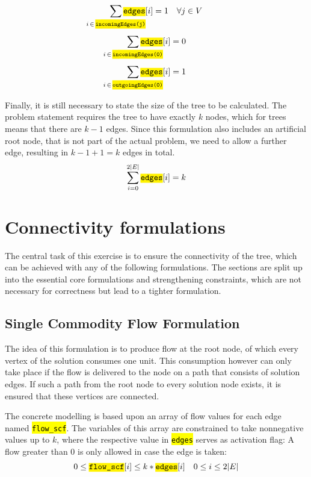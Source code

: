 \documentclass[,%
			paper=a4,%
			DIV12,
			liststotoc,
			bibtotoc,
			draft=false,%
			numbers=noendperiod
			]{scrartcl}
\newcommand{\ilc}[1]{\hl{\texttt{#1}}} %
\begin{document}
\begin{equation}\label{eq:oneIncoming}
	\sum_{\mathclap{i\,\in\,\ilc{incomingEdges(j)}}} \ilc{edges}[i] = 1 \quad \forall j \in V
\end{equation}
\begin{equation}\label{eq:root0}
	\sum_{\mathclap{i\,\in\,\ilc{incomingEdges(0)}}} \ilc{edges}[i] = 0
\end{equation}
\begin{equation}\label{eq:root1}
	\sum_{\mathclap{i\,\in\,\ilc{outgoingEdges(0)}}} \ilc{edges}[i] = 1 
\end{equation}

Finally, it is still necessary to state the size of the tree to be calculated.
The problem statement requires the tree to have exactly $k$ nodes, which for trees means that there are $k-1$ edges.
Since this formulation also includes an artificial root node, that is not part of the actual problem, we need to allow a further edge, resulting in $k-1+1=k$ edges in total.
\begin{equation}
	\sum_{i=0}^{2|E|} \ilc{edges}[i] = k
\end{equation}

\section{Connectivity formulations}

The central task of this exercise is to ensure the connectivity of the tree, which can be achieved with any of the following formulations.
The sections are split up into the essential core formulations and strengthening constraints, which are not necessary for correctness but lead to a tighter formulation.

\subsection{Single Commodity Flow Formulation}

The idea of this formulation is to produce flow at the root node, of which every vertex of the solution consumes one unit.
This consumption however can only take place if the flow is delivered to the node on a path that consists of solution edges.
If such a path from the root node to every solution node exists, it is ensured that these vertices are connected.

The concrete modelling is based upon an array of flow values for each edge named \ilc{flow\_scf}.
The variables of this array are constrained to take nonnegative values up to $k$, where the respective value in \ilc{edges} serves as activation flag: A flow greater than 0 is only allowed in case the edge is taken:
\begin{equation}\label{eq:scf1}
	0 \leq \ilc{flow\_scf}[i] \leq k * \ilc{edges}[i] \quad 0 \leq i \leq 2|E|
\end{equation}
\end{document}
